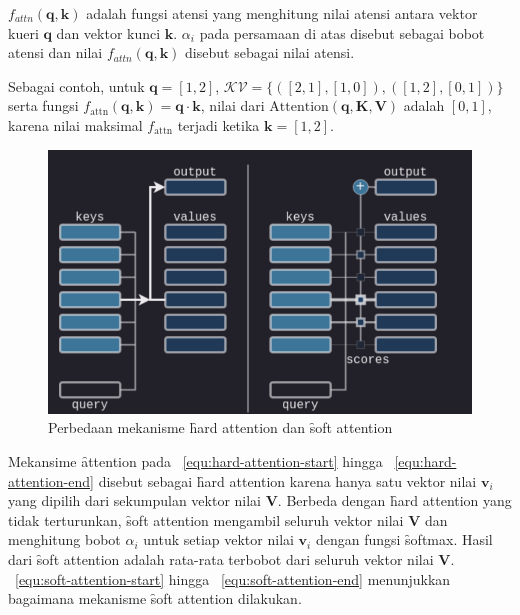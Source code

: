 	$f_{attn}(\mathbf{q}, \mathbf{k})$ adalah fungsi atensi yang menghitung nilai atensi antara vektor kueri $\mathbf{q}$ dan vektor kunci $\mathbf{k}$. $\alpha_i$ pada persamaan di atas disebut sebagai bobot atensi dan nilai $f_{attn}(\mathbf{q}, \mathbf{k})$ disebut sebagai nilai atensi.
	
	Sebagai contoh, untuk $\mathbf{q}= [1,2]$, $\mathcal{KV} = \{([2,1],[1,0]), ([1,2],[0,1])\}$ serta fungsi $f_\text{attn}(\mathbf{q}, \mathbf{k}) =\mathbf{q}\cdot \mathbf{k}$, nilai dari $\text{Attention}( \mathbf{q}, \mathbf{K}, \mathbf{V})$ adalah $[0,1]$, karena nilai maksimal $f_\text{attn}$ terjadi ketika $\mathbf{k} = [1,2]$. 

	\begin{figure}
		\centering
		\includegraphics[width=1\textwidth]{assets/pics/hard-soft-attention-diff.png}
		\caption{Perbedaan mekanisme \f{hard attention} dan \f{soft attention} \citep{pi-tau2023transformer}}
		\label{fig:hard-attention}
	\end{figure}
	
	Mekansime \f{attention} pada \equ~\ref{equ:hard-attention-start} hingga \equ~\ref{equ:hard-attention-end} disebut sebagai \f{hard attention} karena hanya satu vektor nilai $\mathbf{v}_i$ yang dipilih dari sekumpulan vektor nilai $\mathbf{V}$. Berbeda dengan \f{hard attention} yang tidak terturunkan, \f{soft attention} mengambil seluruh vektor nilai $\mathbf{V}$ dan menghitung bobot $\alpha_i$ untuk setiap vektor nilai $\mathbf{v}_i$ dengan fungsi \f{softmax}. Hasil dari \f{soft attention} adalah rata-rata terbobot dari seluruh vektor nilai $\mathbf{V}$. \equ~\ref{equ:soft-attention-start} hingga \equ~\ref{equ:soft-attention-end} menunjukkan bagaimana mekanisme \f{soft attention} dilakukan.
	
